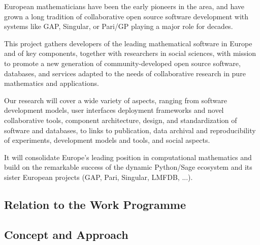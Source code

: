 \documentclass[a4paper,11pt]{article}
\begin{document}
European mathematicians have been the early pioneers in the area, and
have grown a long tradition of collaborative open source software
development with systems like GAP, Singular, or Pari/GP playing a
major role for decades.

This project gathers developers of the leading mathematical software
in Europe and of key components, together with researchers in social
sciences, with mission to promote a new generation of
community-developed open source software, databases, and services
adapted to the needs of collaborative research in pure mathematics and
applications.

Our research will cover a wide variety of aspects, ranging from
software development models, user interfaces   deployment frameworks and novel collaborative tools,
component architecture, design, and standardization of software
 and databases, to links to publication, data archival
and reproducibility of experiments, development models and tools, and
social aspects.

It will consolidate Europe's leading position in computational
mathematics and build on the remarkable success of the dynamic
Python/Sage ecosystem and its sister European projects (GAP, Pari,
Singular, LMFDB, ...).







\draftpage

\subsection{Relation to the Work Programme}


\draftpage

\subsection{Concept and Approach}
\end{document}
